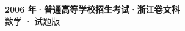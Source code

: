 \documentclass[zihao=-4, a4paper]{ctexart}
\begin{document}
\begin{center}
  {\Large\bfseries 2006 年·普通高等学校招生考试·浙江卷文科}\\[4pt]
  {\large 数学 · 试题版}
\end{center}
\medskip
{}

\end{document}
